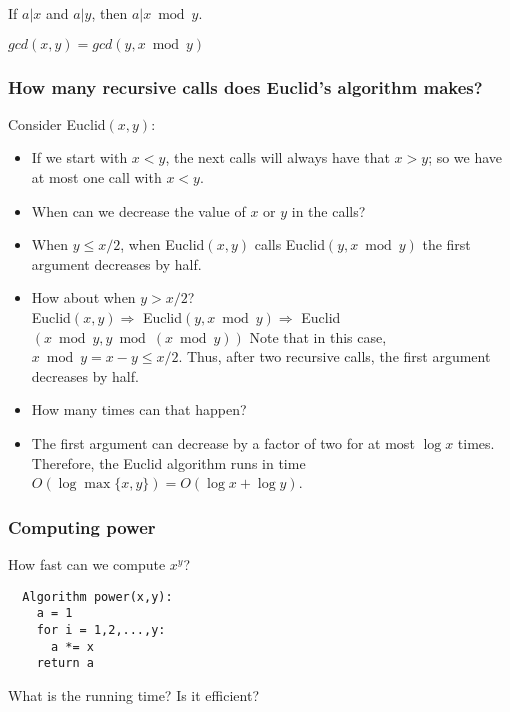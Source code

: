 \begin{frame}
  \begin{lemma}
    If $a|x$ and $a|y$, then $a|x \bmod y$.
  \end{lemma}
  \vspace{0.2in}
  \pause
  \begin{lemma}
    $gcd(x,y)=gcd(y, x\bmod y)$
  \end{lemma}
  \vspace{1.5in}
\end{frame}

\begin{frame}
  \frametitle{How many recursive calls does Euclid's algorithm makes?}
  \pause

  Consider Euclid$(x,y)$:
  \begin{itemize}
  \item If we start with $x<y$, the next calls will always have that
    $x>y$; so we have at most one call with $x<y$.
    \pause
  \item When can we decrease the value of $x$ or $y$ in the calls?
    \pause
  \item When $y\leq x/2$, when Euclid$(x,y)$ calls Euclid$(y,x\bmod y)$ the
    first argument decreases by half.
    \pause
  \item How about when $y> x/2$? \pause \\
    {\small
    Euclid$(x,y) \Rightarrow$ \pause
    Euclid$(y, x\bmod y) \Rightarrow$ \pause
    Euclid$(x\bmod y, y\bmod (x\bmod y))$} \pause
    Note that in this case, $x\bmod y= x-y\leq x/2$. \pause
    Thus, after two recursive calls, the first argument decreases by half.
  \item How many times can that happen?
  \item The first argument can decrease by a factor of two for at most
    $\log x$ times.  Therefore, the Euclid algorithm runs in time
    $O(\log\max\{x,y\})=O(\log x + \log y)$. 
  \end{itemize}
\end{frame}

\begin{frame}[fragile]
  \frametitle{Computing power}

  How fast can we compute $x^y$?

  \pause
  \begin{tcolorbox}
  {\small
\begin{verbatim}
  Algorithm power(x,y):
    a = 1
    for i = 1,2,...,y:
      a *= x
    return a
\end{verbatim}
  }
  \end{tcolorbox}
  
  \pause What is the running time? \pause Is it efficient?
\end{frame}

